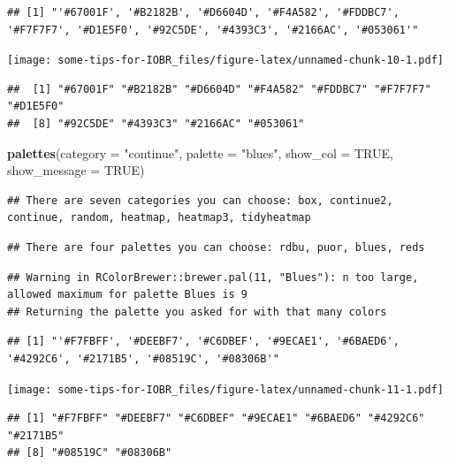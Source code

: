 \documentclass[
  12pt,
]{book}
\newenvironment{Shaded}{\begin{snugshade}}{\end{snugshade}}
\newcommand{\AttributeTok}[1]{\textcolor[rgb]{0.13,0.29,0.53}{#1}}
\newcommand{\ConstantTok}[1]{\textcolor[rgb]{0.56,0.35,0.01}{#1}}
\newcommand{\FunctionTok}[1]{\textcolor[rgb]{0.13,0.29,0.53}{\textbf{#1}}}
\newcommand{\NormalTok}[1]{#1}
\newcommand{\StringTok}[1]{\textcolor[rgb]{0.31,0.60,0.02}{#1}}
\begin{document}
\begin{verbatim}
## [1] "'#67001F', '#B2182B', '#D6604D', '#F4A582', '#FDDBC7', '#F7F7F7', '#D1E5F0', '#92C5DE', '#4393C3', '#2166AC', '#053061'"
\end{verbatim}

\texttt{[image: some-tips-for-IOBR\_files/figure-latex/unnamed-chunk-10-1.pdf]}

\begin{verbatim}
##  [1] "#67001F" "#B2182B" "#D6604D" "#F4A582" "#FDDBC7" "#F7F7F7" "#D1E5F0"
##  [8] "#92C5DE" "#4393C3" "#2166AC" "#053061"
\end{verbatim}

\begin{Shaded}
\begin{Highlighting}[]
\FunctionTok{palettes}\NormalTok{(}\AttributeTok{category =} \StringTok{"continue"}\NormalTok{, }\AttributeTok{palette =} \StringTok{"blues"}\NormalTok{, }\AttributeTok{show\_col =} \ConstantTok{TRUE}\NormalTok{, }\AttributeTok{show\_message =} \ConstantTok{TRUE}\NormalTok{)}
\end{Highlighting}
\end{Shaded}

\begin{verbatim}
## There are seven categories you can choose: box, continue2, continue, random, heatmap, heatmap3, tidyheatmap
\end{verbatim}

\begin{verbatim}
## There are four palettes you can choose: rdbu, puor, blues, reds
\end{verbatim}

\begin{verbatim}
## Warning in RColorBrewer::brewer.pal(11, "Blues"): n too large, allowed maximum for palette Blues is 9
## Returning the palette you asked for with that many colors
\end{verbatim}

\begin{verbatim}
## [1] "'#F7FBFF', '#DEEBF7', '#C6DBEF', '#9ECAE1', '#6BAED6', '#4292C6', '#2171B5', '#08519C', '#08306B'"
\end{verbatim}

\texttt{[image: some-tips-for-IOBR\_files/figure-latex/unnamed-chunk-11-1.pdf]}

\begin{verbatim}
## [1] "#F7FBFF" "#DEEBF7" "#C6DBEF" "#9ECAE1" "#6BAED6" "#4292C6" "#2171B5"
## [8] "#08519C" "#08306B"
\end{verbatim}
\end{document}
